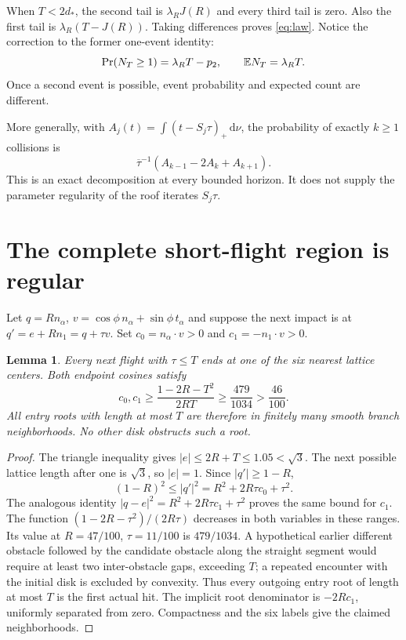 \documentclass[11pt,reqno]{amsart}
\numberwithin{equation}{section}
\newtheorem{lemma}[theorem]{Lemma}
\theoremstyle{remark}\newtheorem{remark}[theorem]{Remark}
\newcommand{\dd}{\,\mathrm d}\newcommand{\one}{\mathbf1}\newcommand{\T}{\mathbb T}
\begin{document}
When $T<2d_*$, the second tail is $\lambda_R J(R)$ and every third tail is zero. Also the first tail is $\lambda_R(T-J(R))$. Taking differences proves \eqref{eq:law}. Notice the correction to the former one-event identity:
\begin{equation}\label{eq:correction}
 \Pr(N_T\ge1)=\lambda_RT-p_2,
 \qquad \mathbb E N_T=\lambda_RT.
\end{equation}
Once a second event is possible, event probability and expected count are different.

More generally, with $A_j(t)=\int(t-S_j\tau)_+\dd\nu$, the probability of exactly $k\ge1$ collisions is
\[
 \overline\tau^{-1}(A_{k-1}-2A_k+A_{k+1}).
\]
This is an exact decomposition at every bounded horizon. It does not supply the parameter regularity of the roof iterates $S_j\tau$.

\section{The complete short-flight region is regular}
Let $q=Rn_\alpha$, $v=\cos\phi\,n_\alpha+\sin\phi\,t_\alpha$ and suppose the next impact is at $q'=e+Rn_1=q+\tau v$. Set $c_0=n_\alpha\cdot v>0$ and $c_1=-n_1\cdot v>0$.
\begin{lemma}\label{lem:transverse}
Every next flight with $\tau\le T$ ends at one of the six nearest lattice centers. Both endpoint cosines satisfy
\begin{equation}\label{eq:cos}
 c_0,c_1\ge\frac{1-2R-T^2}{2RT}\ge\frac{479}{1034}>\frac{46}{100}.
\end{equation}
All entry roots with length at most $T$ are therefore in finitely many smooth branch neighborhoods. No other disk obstructs such a root.
\end{lemma}
\begin{proof}
The triangle inequality gives $|e|\le2R+T\le1.05<\sqrt3$. The next possible lattice length after one is $\sqrt3$, so $|e|=1$. Since $|q'|\ge1-R$,
\[
 (1-R)^2\le |q'|^2=R^2+2R\tau c_0+\tau^2.
\]
The analogous identity $|q-e|^2=R^2+2R\tau c_1+\tau^2$ proves the same bound for $c_1$. The function $(1-2R-\tau^2)/(2R\tau)$ decreases in both variables in these ranges. Its value at $R=47/100$, $\tau=11/100$ is $479/1034$. A hypothetical earlier different obstacle followed by the candidate obstacle along the straight segment would require at least two inter-obstacle gaps, exceeding $T$; a repeated encounter with the initial disk is excluded by convexity. Thus every outgoing entry root of length at most $T$ is the first actual hit. The implicit root denominator is $-2Rc_1$, uniformly separated from zero. Compactness and the six labels give the claimed neighborhoods.
\end{proof}
\end{document}
